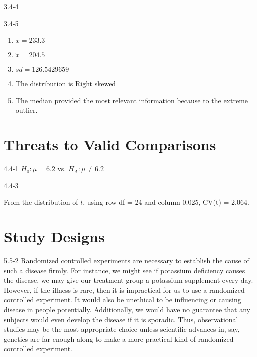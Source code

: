 \begin{exsol@solution}{3.4-4}


\end{exsol@solution}
\begin{exsol@solution}{3.4-5}

\begin{enumerate}
\item $\bar{x} = 233.3$
\item $\tilde{x} = 204.5$
\item $sd = 126.5429659 $
\item The distribution is Right skewed
\item The median provided the most relevant information because to the extreme outlier.
\end{enumerate}

\end{exsol@solution}
\setcounter{chapter}{4}\chapter{Threats to Valid Comparisons}
\begin{exsol@solution}{4.4-1}
	  $H_0: \mu = 6.2$ vs. $H_A: \mu \neq 6.2$
\end{exsol@solution}
\begin{exsol@solution}{4.4-3}

    From the distribution of $t$, using row df = 24 and column 0.025, CV(t) = 2.064.
\end{exsol@solution}
\setcounter{chapter}{5}\chapter{Study Designs}
\begin{exsol@solution}{5.5-2}
Randomized controlled experiments are necessary to establish the cause of such a disease firmly. For instance, we might see if potassium deficiency causes the disease, we may give our treatment group a potassium supplement every day. However, if the illness is rare, then it is impractical for us to use a randomized controlled experiment.  It would also be unethical to be influencing or causing disease in people potentially.  Additionally, we would have no guarantee that any subjects would even develop the disease if it is sporadic. Thus, observational studies may be the most appropriate choice unless scientific advances in, say, genetics are far enough along to make a more practical kind of randomized controlled experiment.
	
\end{exsol@solution}
